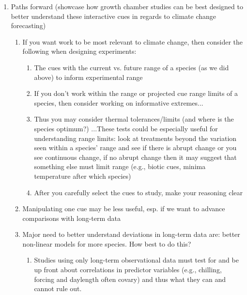 \documentclass[11pt,letterpaper]{article}
\begin{document}
\begin{enumerate}
\begin{enumerate}
\begin{enumerate}
\end{enumerate}
\end{enumerate}
\item Paths forward (showcase how growth chamber studies can be best designed to better understand these interactive cues in regards to climate change forecasting) 
\begin{enumerate}
\item If you want work to be most relevant to climate change, then consider the following when designing experiments:
\begin{enumerate}
\item The cues with the current vs. future range of a species (as we did above) to inform experimental range
\item If you don't work within the range or projected cue range limits of a species, then consider working on informative extremes...
\item Thus you may consider thermal tolerances/limits (and where is the species optimum?) ...These tests could be especially useful for understanding range limits: look at treatments beyond the variation seen within a species' range and see if there is abrupt change or you see continuous change, if no abrupt change then it may suggest that something else must limit range (e.g., biotic cues, minima temperature after which species) 
\item After you carefully select the cues to study, make your reasoning clear  
\end{enumerate}
\item Manipulating one cue may be less useful, esp. if we want to advance comparisons with long-term data
\item Major need to better understand deviations in long-term data are: better non-linear models for more species. How best to do this?
\begin{enumerate}
\item Studies using only long-term observational data must test for and be up front about correlations in predictor variables (e.g., chilling, forcing and daylength often covary) and thus what they can and cannot rule out.  %

\end{enumerate}
\end{enumerate}
\end{enumerate}
\end{document}
